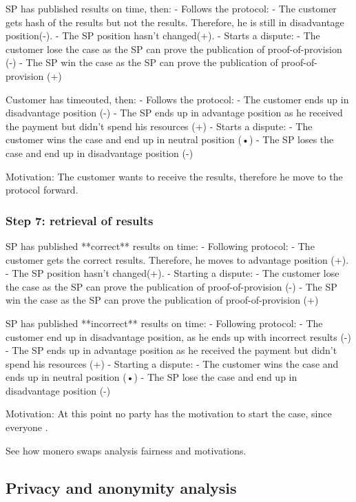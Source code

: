 \documentclass{article}
\begin{document}
SP has published results on time, then:
- Follows the protocol:
	- The customer gets hash of the results but not the results. Therefore, he is still in disadvantage position(-).
	- The SP position hasn't changed(+).
- Starts a dispute:
	- The customer lose the case as the SP can prove the publication of proof-of-provision (-)
	- The SP win the case as the SP can prove the publication of proof-of-provision (+)

Customer has timeouted, then:
- Follows the protocol:
	- The customer ends up in disadvantage position (-)
	- The SP ends up in advantage position as he received the payment but didn't spend his resources (+)
- Starts a dispute:
	- The customer wins the case and end up in neutral position (•)
	- The SP loses the case and end up in disadvantage position (-)


Motivation:
The customer wants to receive the results, therefore he move to the protocol forward.

\subsubsection{Step 7: retrieval of results}

SP has published **correct** results on time:
- Following protocol:
	- The customer gets the correct results. Therefore, he moves to advantage position (+).
	- The SP position hasn't changed(+).
- Starting a dispute:
	- The customer lose the case as the SP can prove the publication of proof-of-provision (-)
	- The SP win the case as the SP can prove the publication of proof-of-provision (+)

SP has published **incorrect** results on time:
- Following protocol:
	- The customer end up in disadvantage position, as he ends up with incorrect results (-)
	- The SP ends up in advantage position as he received the payment but didn't spend his resources (+)
- Starting a dispute:
	- The customer wins the case and ends up in neutral position (•)
	- The SP lose the case and end up in disadvantage position (-)


Motivation:
At this point no party has the motivation to start the case, since everyone  . 


See how monero swaps analysis fairness and motivations.


\subsection{Privacy and anonymity analysis}
\end{document}
